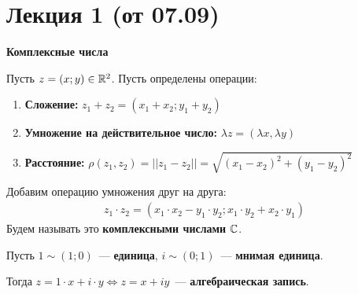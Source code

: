 \section{Лекция 1 (от 07.09)}
\begin{center}
    \textbf{Комплексные числа}
\end{center}
\Def
Пусть $z = \left( x;y \right) \in \mathbb{R}^2$. Пусть определены операции:
\begin{enumerate}
    \item \textbf{Сложение:} $z_1 + z_2 = \left( x_1+x_2; y_1+y_2 \right)$
    \item \textbf{Умножение на действительное число:} $\lambda z = \left(\lambda
        x, \lambda y \right)$
    \item \textbf{Расстояние:} $\rho(z_1, z_2) = \left| \left| z_1 - z_2 \right|
    \right| = \sqrt{\left( x_1 - x_2 \right)^2 + (y_1 - y_2)^2}$
\end{enumerate}
Добавим операцию умножения друг на друга:
\begin{align}
  z_1 \cdot z_2 = \left( x_1 \cdot x_2 - y_1 \cdot y_2; x_1 \cdot y_2 + x_2 \cdot y_1 \right)
\end{align}
Будем называть это \textbf{комплексными числами} $\mathbb{C}$.

Пусть $1 \sim (1; 0)$~--- \textbf{единица}, $i \sim (0;1)$~--- \textbf{мнимая
  единица}.

Тогда $z = 1 \cdot x + i \cdot y \Leftrightarrow z = x + iy$~---
\textbf{алгебраическая запись}.
